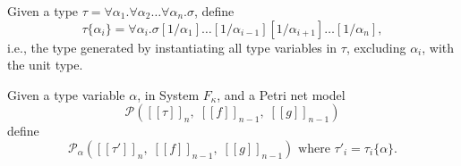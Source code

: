 \documentclass[../../Dissertation.tex]{subfiles}
\begin{document}
\begin{definition}\label{def:instantunit}
  Given a type $\tau = \forall \alpha_1.\forall \alpha_2\ldots\forall \alpha_n.\sigma$, define
  \begin{equation*}
    \tau\{\alpha_i\} = \forall \alpha_i.\sigma[1/\alpha_1]\ldots[1/\alpha_{i-1}][1/\alpha_{i+1}]\ldots[1/\alpha_n],
  \end{equation*}
  i.e., the type generated by instantiating all type variables in $\tau$, excluding $\alpha_i$, with the unit type.
\end{definition}

\begin{definition}
  Given a type variable $\alpha$, in System $F_\kappa$, and a Petri net model 
  \begin{equation*}
  \mathcal{P}([\![\tau]\!]_n,\; [\![f]\!]_{n-1},\; [\![g]\!]_{n-1})
  \end{equation*}
  define
  \begin{equation*}
    \mathcal{P}_\alpha([\![\tau']\!]_n,\; [\![f]\!]_{n-1},\; [\![g]\!]_{n-1}) \text{ where } \tau'_i = \tau_i\{\alpha\}.
  \end{equation*}
\end{definition}
\end{document}

